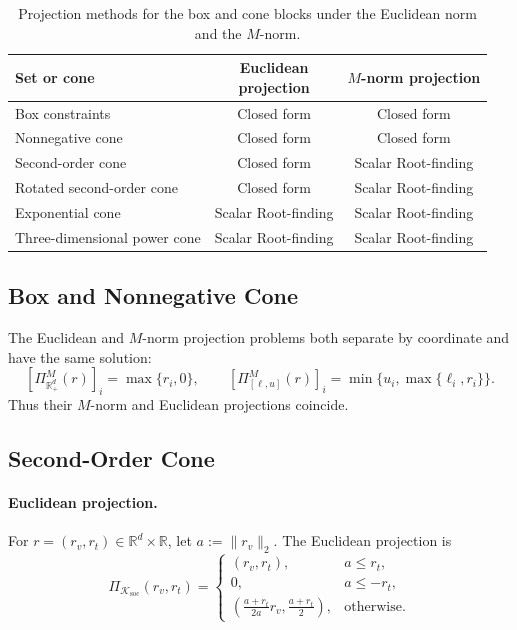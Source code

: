 \documentclass[letterpaper]{article} %
\theoremstyle{definition}
\theoremstyle{remark}
\newcommand{\papertablesetup}{\small\setstretch{1.0}\renewcommand{\arraystretch}{1.2}}
\begin{document}
\begin{table}[H]
    \centering
    \papertablesetup
    \caption{Projection methods for the box and cone blocks under the
    Euclidean norm and the $M$-norm.}
    \label{tab:cone-projection-methods}
    \medskip
    \begin{tabular*}{\textwidth}{@{\extracolsep{\fill}}lcc@{}}
        \toprule
        Set or cone
        & \shortstack{Euclidean\\projection}
        & \shortstack{$M$-norm\\projection} \\
        \midrule
        Box constraints              & Closed form & Closed form \\
        Nonnegative cone             & Closed form & Closed form \\
        Second-order cone            & Closed form & Scalar Root-finding \\
        Rotated second-order cone    & Closed form & Scalar Root-finding \\
        Exponential cone             & Scalar Root-finding & Scalar Root-finding \\
        Three-dimensional power cone & Scalar Root-finding & Scalar Root-finding \\
        \bottomrule
    \end{tabular*}
\end{table}

\subsection{Box and Nonnegative Cone}

The Euclidean and $M$-norm projection problems both separate by coordinate
and have the same solution:
\begin{equation}
\label{eq:box-nonnegative-metric-projection}
    [\Pi_{\mathbb R_+^d}^{M}(r)]_i=\max\{r_i,0\},
    \qquad
    [\Pi_{[\ell,u]}^{M}(r)]_i
    =\min\{u_i,\max\{\ell_i,r_i\}\}.
\end{equation}
Thus their $M$-norm and Euclidean projections coincide.

\subsection{Second-Order Cone}

\paragraph{Euclidean projection.}
For $r=(r_v,r_t)\in\mathbb R^d\times\mathbb R$, let
$a:=\|r_v\|_2$.  The Euclidean projection is
\begin{equation}
\label{eq:soc-euclidean-projection}
    \Pi_{\mathcal K_{\mathrm{soc}}}(r_v,r_t)
    =
    \begin{cases}
        (r_v,r_t), & a\le r_t,\\
        0, & a\le-r_t,\\
        \displaystyle
        \left(\frac{a+r_t}{2a}r_v,\frac{a+r_t}{2}\right),
        & \text{otherwise}.
\end{cases}
\end{equation}
\end{document}
